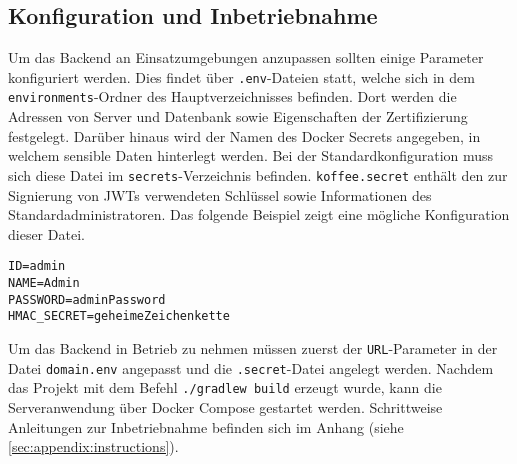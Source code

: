 \subsection{Konfiguration und Inbetriebnahme}
\label{subsec:backend:configuration}
Um das Backend an Einsatzumgebungen anzupassen sollten einige Parameter konfiguriert werden.
Dies findet über \verb|.env|-Dateien statt, welche sich in dem \verb|environments|-Ordner des Hauptverzeichnisses befinden.
Dort werden die Adressen von Server und Datenbank sowie Eigenschaften der Zertifizierung festgelegt.
Darüber hinaus wird der Namen des Docker Secrets angegeben, in welchem sensible Daten hinterlegt werden.
Bei der Standardkonfiguration muss sich diese Datei im \verb|secrets|-Verzeichnis befinden.
\verb|koffee.secret| enthält den zur Signierung von JWTs verwendeten Schlüssel sowie Informationen des Standardadministratoren.
Das folgende Beispiel zeigt eine mögliche Konfiguration dieser Datei.
\begin{lstlisting}[style=simpleListing, title={Beispielinhalt von /secrets/koffee.secret}]
ID=admin
NAME=Admin
PASSWORD=adminPassword
HMAC_SECRET=geheimeZeichenkette
\end{lstlisting}
Um das Backend in Betrieb zu nehmen müssen zuerst der \verb|URL|-Parameter in der Datei \verb|domain.env| angepasst und die \verb|.secret|-Datei angelegt werden.
Nachdem das Projekt mit dem Befehl \verb|./gradlew build| erzeugt wurde, kann die Serveranwendung über Docker Compose gestartet werden.
Schrittweise Anleitungen zur Inbetriebnahme befinden sich im Anhang (siehe \autoref{sec:appendix:instructions}).
